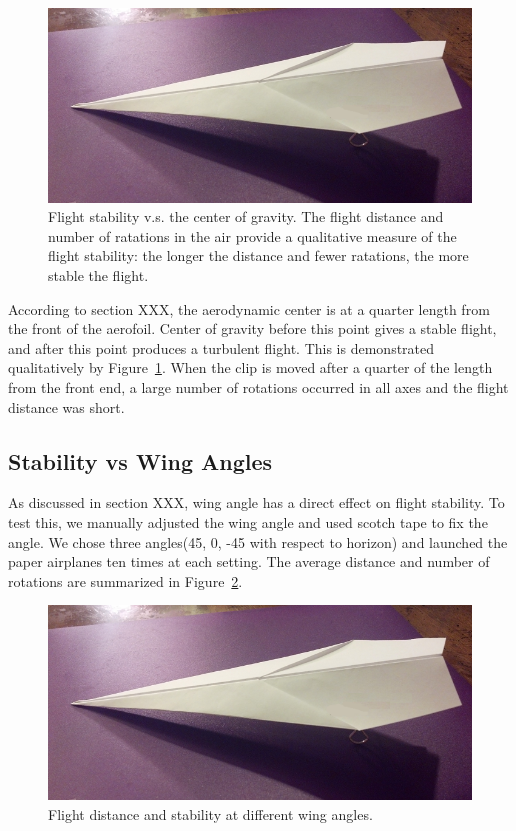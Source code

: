 \begin{figure}[hl]
	\centering
		\includegraphics[scale=0.5]{figures/centerofgravity.png}
		\caption{Flight stability v.s. the center of gravity. The flight distance and number of ratations in the air provide a qualitative measure of the flight 
		stability: the longer the distance and fewer ratations, the more stable the flight.}
	\label{fig:centerofgravity}
\end{figure}

According to section XXX, the aerodynamic center is at a quarter length from the front of the aerofoil. Center of gravity before this point gives a stable flight, and
after this point produces a turbulent flight. This is demonstrated qualitatively by Figure~\ref{fig:centerofgravity}. When the clip is moved after a 
quarter of the length from the front end, a large number of rotations occurred in all axes and the flight distance was short.


\subsection{Stability vs Wing Angles}
As discussed in section XXX, wing angle has a direct effect on flight stability. To test this, we manually adjusted the wing angle and used scotch tape
to fix the angle. We chose three angles(45, 0, -45 with respect to horizon) and launched the paper airplanes ten times at each setting. The average distance and number of rotations 
are summarized in Figure~\ref{fig:angles}. 

\begin{figure}[hl]
	\centering
		\includegraphics[scale=0.5]{figures/angles.png}
		\caption{Flight distance and stability at different wing angles.}
	\label{fig:angles}
\end{figure}

